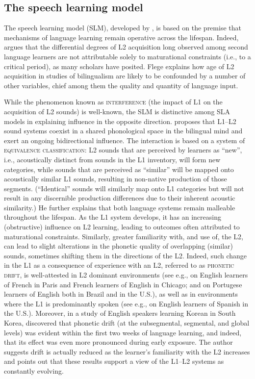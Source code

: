 \documentclass[output=paper]{langsci/langscibook}
\begin{document}
 
\subsection{The speech learning model}
\label{sec:nove:3.2}


The speech learning model (SLM), developed by \citet{Flege1995, Flege1996}, is based on the premise that mechanisms of language learning remain operative across the lifespan. Indeed, \citet{Flege2007} argues that the differential degrees of L2 acquisition long observed among second language learners are not attributable solely to maturational constraints (i.e., to a critical period), as many scholars have posited. Flege explains how age of L2 acquisition in studies of bilingualism are likely to be confounded by a number of other variables, chief among them the quality and quantity of language input. 

While the phenomenon known as \textsc{interference} (the impact of L1 on the acquisition of L2 sounds) is well-known, the SLM is distinctive among SLA models in explaining influence in the opposite direction. \citet{Flege1995, Flege1996} proposes that L1--L2 sound systems coexist in a shared phonological space in the bilingual mind and exert an ongoing bidirectional influence. The interaction is based on a system of \textsc{equivalence} \textsc{classification}: L2 sounds that are perceived by learners as “new”, i.e., acoustically distinct from sounds in the L1 inventory, will form new categories, while sounds that are perceived as “similar” will be mapped onto acoustically similar L1 sounds, resulting in non-native production of those segments. (“Identical” sounds will similarly map onto L1 categories but will not result in any discernible production differences due to their inherent acoustic similarity.) He further explains that both language systems remain malleable throughout the lifespan. As the L1 system develops, it has an increasing (obstructive) influence on L2 learning, leading to outcomes often attributed to maturational constraints. Similarly, greater familiarity with, and use of, the L2, can lead to slight alterations in the phonetic quality of overlapping (similar) sounds, sometimes shifting them in the directions of the L2. Indeed, such change in the L1 as a consequence of experience with an L2, referred to as \textsc{phonetic} \textsc{drift}, is well-attested in L2 dominant environments (see e.g., \citealt{Flege1987} on English learners of French in Paris and French learners of English in Chicago; and \citealt{SancierFowler1997} on Portugese learners of English both in Brazil and in the U.S.), as well as in environments where the L1 is predominantly spoken (see e.g., \citealt{HerdEtAl2015} on English learners of Spanish in the U.S.). Moreover, in a study of English speakers learning Korean in South Korea, \citet{Chang2012, Chang2013} discovered that phonetic drift (at the subsegmental, segmental, and global levels) was evident within the first two weeks of language learning, and indeed, that its effect was even more pronounced during early exposure. The author suggests drift is actually reduced as the learner’s familiarity with the L2 increases and points out that these results support a view of the L1--L2 systems as constantly evolving.
\end{document}
